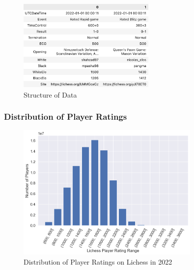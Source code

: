 \documentclass[a4paper, 11pt]{article}
\begin{document}
\begin{figure}[H]
    \centering
    \caption{Structure of Data}
    \label{fig:structureOfData}
    \includegraphics[width=0.6\textwidth]{Structure of Data Transposed.png}
\end{figure}

\subsubsection{Distribution of Player Ratings}

\begin{figure}[H]
    \centering
    \caption{Distribution of Player Ratings on Lichess in 2022}
    \label{fig:distributionOfPlayerRatings}
    \includegraphics[width=0.8\textwidth]{Distribution of Player Ratings.png}
\end{figure}
\end{document}

